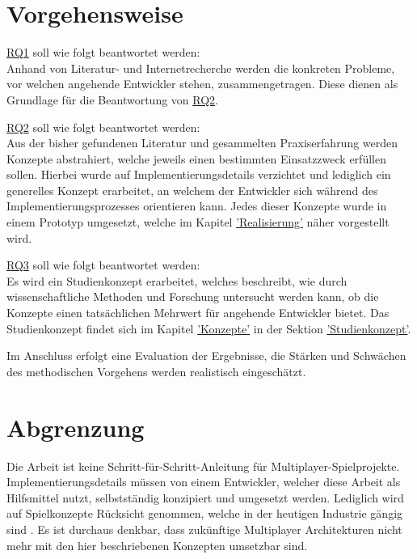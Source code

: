 \section{Vorgehensweise}

\hyperref[RQ1]{RQ1} soll wie folgt beantwortet werden: \\
Anhand von Literatur- und Internetrecherche werden die konkreten Probleme, vor welchen angehende Entwickler stehen, zusammengetragen. Diese dienen als Grundlage für die Beantwortung von \hyperref[RQ2]{RQ2}.

\hyperref[RQ2]{RQ2} soll wie folgt beantwortet werden: \\
Aus der bisher gefundenen Literatur und gesammelten Praxiserfahrung werden Konzepte abstrahiert, welche jeweils einen bestimmten Einsatzzweck erfüllen sollen. Hierbei wurde auf Implementierungsdetails verzichtet und lediglich ein generelles Konzept erarbeitet, an welchem der Entwickler sich während des Implementierungsprozesses orientieren kann. Jedes dieser Konzepte wurde in einem Prototyp umgesetzt, welche im Kapitel \hyperref[sec:realisierung]{'Realisierung'} näher vorgestellt wird.

\hyperref[RQ3]{RQ3} soll wie folgt beantwortet werden: \\
Es wird ein Studienkonzept erarbeitet, welches beschreibt, wie durch wissenschaftliche Methoden und Forschung untersucht werden kann, ob die Konzepte einen tatsächlichen Mehrwert für angehende Entwickler bietet. Das Studienkonzept findet sich im Kapitel \hyperref[sec:konzepte]{'Konzepte'} in der Sektion \hyperref[studienkonzept]{'Studienkonzept'}.

Im Anschluss erfolgt eine Evaluation der Ergebnisse, die Stärken und Schwächen des methodischen Vorgehens werden realistisch eingeschätzt.

\section{Abgrenzung}

Die Arbeit ist keine Schritt-für-Schritt-Anleitung für Multiplayer-Spielprojekte. Implementierungsdetails müssen von einem Entwickler, welcher diese Arbeit als Hilfsmittel nutzt, selbstständig konzipiert und umgesetzt werden. Lediglich wird auf Spielkonzepte Rücksicht genommen, welche in der heutigen Industrie gängig sind \cite{Wikipedia.2021b}. Es ist durchaus denkbar, dass zukünftige Multiplayer Architekturen nicht mehr mit den hier beschriebenen Konzepten umsetzbar sind.

